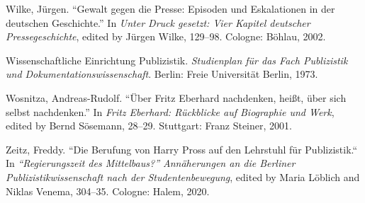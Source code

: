 \documentclass{tufte-handout}
\begin{document}
\begin{hangparas}{.25in}{1}
Wilke, Jürgen. ``Gewalt gegen die Presse: Episoden und Eskalationen in
der deutschen Geschichte.'' In \emph{Unter Druck gesetzt: Vier Kapitel
deutscher Pressegeschichte}, edited by Jürgen Wilke, 129--98. Cologne:
Böhlau, 2002.

Wissenschaftliche Einrichtung Publizistik. \emph{Studienplan für das
Fach Publizistik und Dokumentationswissenschaft}. Berlin: Freie
Universität Berlin, 1973.

Wosnitza, Andreas-Rudolf. ``Über Fritz Eberhard nachdenken, heißt, über
sich selbst nachdenken.'' In \emph{Fritz Eberhard: Rückblicke auf
Biographie und Werk}, edited by Bernd Sösemann, 28--29. Stuttgart: Franz
Steiner, 2001.

Zeitz, Freddy. ``Die Berufung von Harry Pross auf den Lehrstuhl für
Publizistik.`` In \emph{``Regierungszeit des Mittelbaus?'' Annäherungen
an die Berliner Publizistikwissenschaft nach der Studentenbewegung},
edited by Maria Löblich and Niklas Venema, 304--35. Cologne: Halem,
2020.



\end{hangparas}
\end{document}
